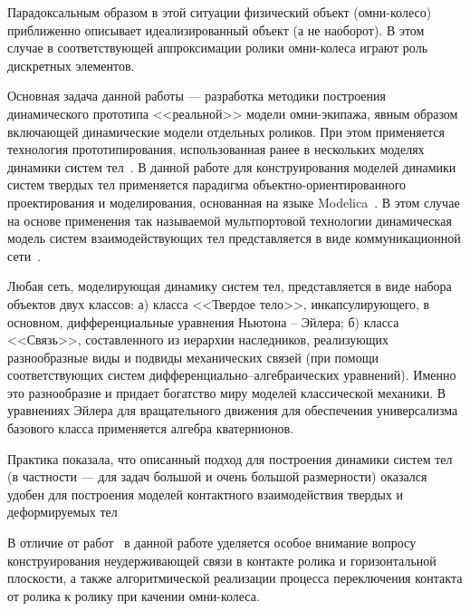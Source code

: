 \documentclass[12pt,a4paper]{article}
\begin{document}
Парадоксальным образом в этой ситуации физический объект (омни-колесо) 
приближенно описывает идеализированный объект (а не наоборот). В этом случае в
соответствующей аппроксимации ролики омни-колеса играют роль дискретных 
элементов.

Основная задача данной работы --- разработка методики построения динамического 
прототипа <<реальной>> модели омни-экипажа, явным образом включающей 
динамические модели отдельных роликов. При этом применяется технология 
прототипирования, использованная ранее в нескольких моделях динамики систем 
тел~\cite{Kosenko2007}. В данной работе для конструирования моделей динамики
систем твердых тел применяется парадигма объектно-ориентированного 
проектирования и моделирования, основанная на языке 
Modelica~\cite{KosenkoKuznetzova}. В этом случае на основе применения так 
называемой мультпортовой технологии динамическая модель систем 
взаимодействующих тел представляется в виде коммуникационной 
сети~\cite{Kosenko2007}.

Любая сеть, моделирующая динамику систем тел, представляется в виде набора 
объектов двух классов: а) класса <<Твердое тело>>, инкапсулирующего, в 
основном, дифференциальные уравнения Ньютона -- Эйлера; б) класса <<Связь>>,
составленного из иерархии наследников, реализующих разнообразные виды и подвиды
механических связей (при помощи соответствующих систем 
дифференциально--алгебраических уравнений). Именно это разнообразие и придает 
богатство миру моделей классической механики. В уравнениях Эйлера для 
вращательного движения для обеспечения универсализма базового класса 
применяется алгебра кватернионов.

Практика показала, что описанный подход для построения динамики систем тел (в
частности --- для задач большой и очень большой размерности) оказался удобен 
для построения моделей контактного взаимодействия твердых и деформируемых 
тел~\cite{KosenkoAlexandrov,KosenkoGusev}

В отличие от работ~\cite{Kalman,Tobolar} в данной работе уделяется особое 
внимание вопросу конструирования неудерживающей связи в контакте ролика и 
горизонтальной плоскости, а также алгоритмической реализации процесса 
переключения контакта от ролика к ролику при качении омни-колеса.
\end{document}

